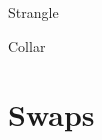 \documentclass[10pt]{article}
\begin{document}
      \begin{core}{Strangle}


      \end{core}

      \begin{core}{Collar}


      \end{core}
 
\section{Swaps}

\end{document}
